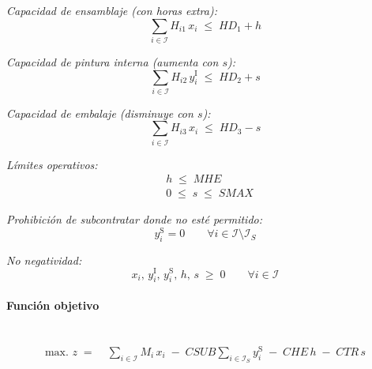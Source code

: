 \textit{Capacidad de ensamblaje (con horas extra):}
\begin{equation}
\sum_{i\in\mathcal{I}} H_{i1}\, x_i \;\leq\; HD_1 + h
\end{equation}

\textit{Capacidad de pintura interna (aumenta con $s$):}
\begin{equation}
\sum_{i\in\mathcal{I}} H_{i2}\, y_i^{\mathrm{I}} \;\leq\; HD_2 + s
\end{equation}

\textit{Capacidad de embalaje (disminuye con $s$):}
\begin{equation}
\sum_{i\in\mathcal{I}} H_{i3}\, x_i \;\leq\; HD_3 - s
\end{equation}

\textit{Límites operativos:}
\begin{align}
& h \;\leq\; MHE \\
& 0 \;\leq\; s \;\leq\; SMAX
\end{align}

\textit{Prohibición de subcontratar donde no esté permitido:}
\begin{equation}
y_i^{\mathrm{S}} = 0 \qquad \forall i \in \mathcal{I}\setminus\mathcal{I}_S
\end{equation}

\textit{No negatividad:}
\begin{equation}
x_i,\, y_i^{\mathrm{I}},\, y_i^{\mathrm{S}},\, h,\, s \;\geq\; 0 \qquad \forall i \in \mathcal{I}
\end{equation}

\paragraph{Función objetivo}\mbox{}\\
\begin{align}
\mbox{max. } z \;=\;&
\sum_{i\in\mathcal{I}} M_i\, x_i
\;-\; CSUB \sum_{i\in\mathcal{I}_S} y_i^{\mathrm{S}}
\;-\; CHE\, h
\;-\; CTR\, s
\end{align}

